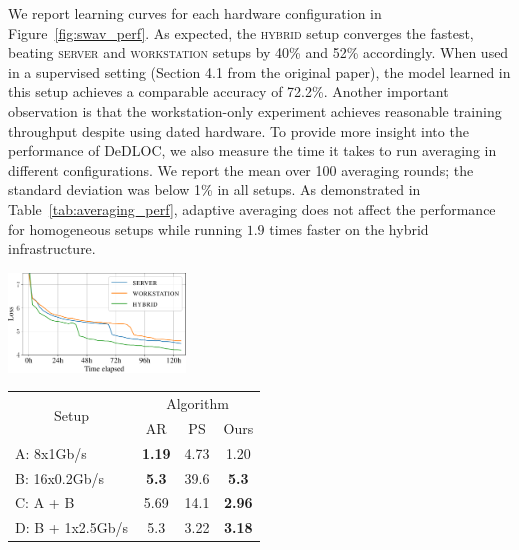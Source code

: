 We report learning curves for each hardware configuration in Figure~\ref{fig:swav_perf}. As expected, the \textsc{hybrid} setup converges the fastest, beating \textsc{server} and \textsc{workstation} setups by 40\% and 52\% accordingly. When used in a supervised setting (Section 4.1 from the original paper), the model learned in this setup achieves a comparable accuracy of 72.2\%.  Another important observation is that the workstation-only experiment achieves reasonable training throughput despite using dated hardware. To provide more insight into the performance of DeDLOC, we also measure the time it takes to run averaging in different configurations. We report the mean over 100 averaging rounds; the standard deviation was below 1\% in all setups. As demonstrated in Table~\ref{tab:averaging_perf}, adaptive averaging does not affect the performance for homogeneous setups while running $1.9$ times faster on the hybrid infrastructure.

\vspace{4pt}
\begin{minipage}[b][][b]{0.5\textwidth}
\centering
\includegraphics[height=100px]{resources/swav.pdf}
\label{fig:swav_perf}
\end{minipage}
\begin{minipage}[b][][b]{0.49\textwidth}
\centering
\renewcommand{\arraystretch}{1.2}
\begin{tabular}{lccc}
\toprule
\multicolumn{1}{c}{\multirow{2}{*}{Setup}} & \multicolumn{3}{c}{Algorithm} \\
 & AR & PS & Ours             \\ 
\midrule
A: 8x1Gb/s & \textbf{1.19} & 4.73 & 1.20 \\
B: 16x0.2Gb/s & \textbf{5.3} & 39.6 & \textbf{5.3} \\
C: A + B& 5.69 & 14.1 & \textbf{2.96} \\
D: B + 1x2.5Gb/s & 5.3 & 3.22 & \textbf{3.18} \\
\bottomrule
\end{tabular}
\vspace{8pt}
\label{tab:averaging_perf}
\end{minipage}
\vspace{-4pt}

